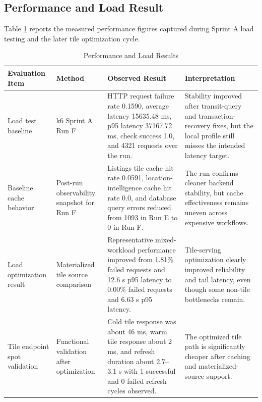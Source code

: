 \subsection{Performance and Load Result}

Table \ref{tab:chapter7-performance-results} reports the measured performance figures captured during Sprint A load testing and the later tile optimization cycle.

\begin{table}[htbp]
    \centering
    \small
    \renewcommand{\arraystretch}{1.25}
    \begin{tabularx}{\textwidth}{>{\raggedright\arraybackslash}p{}>{\raggedright\arraybackslash}p{}>{\raggedright\arraybackslash}p{}>{\raggedright\arraybackslash}X}
        \toprule
        \rowcolor[gray]{0.9} \textbf{Evaluation Item} & \textbf{Method} & \textbf{Observed Result} & \textbf{Interpretation} \\
        \midrule
        Load test baseline & k6 Sprint A Run F & HTTP request failure rate 0.1590, average latency 15635.48 ms, p95 latency 37167.72 ms, check success 1.0, and 4321 requests over the run. & Stability improved after transit-query and transaction-recovery fixes, but the local profile still misses the intended latency target. \\
        Baseline cache behavior & Post-run observability snapshot for Run F & Listings tile cache hit rate 0.0591, location-intelligence cache hit rate 0.0, and database query errors reduced from 1093 in Run E to 0 in Run F. & The run confirms cleaner backend stability, but cache effectiveness remains uneven across expensive workflows. \\
        Load optimization result & Materialized tile source comparison & Representative mixed-workload performance improved from 1.81\% failed requests and 12.6 s p95 latency to 0.00\% failed requests and 6.63 s p95 latency. & Tile-serving optimization clearly improved reliability and tail latency, even though some non-tile bottlenecks remain. \\
        Tile endpoint spot validation & Functional validation after optimization & Cold tile response was about 46 ms, warm tile response about 2 ms, and refresh duration about 2.7--3.1 s with 1 successful and 0 failed refresh cycles observed. & The optimized tile path is significantly cheaper after caching and materialized-source support. \\
        \bottomrule
    \end{tabularx}
    \caption{Performance and Load Results}
    \label{tab:chapter7-performance-results}
\end{table}

